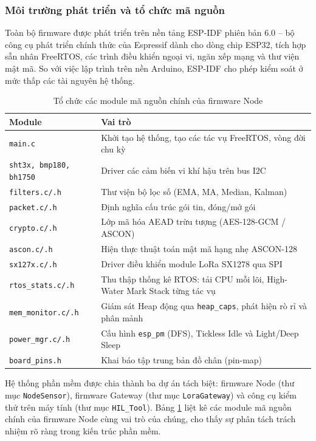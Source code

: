 \subsubsection{Môi trường phát triển và tổ chức mã nguồn}
Toàn bộ firmware được phát triển trên nền tảng ESP-IDF phiên bản 6.0 -- bộ công cụ phát triển chính thức của Espressif dành cho dòng chip ESP32, tích hợp sẵn nhân FreeRTOS, các trình điều khiển ngoại vi, ngăn xếp mạng và thư viện mật mã. So với việc lập trình trên nền Arduino, ESP-IDF cho phép kiểm soát ở mức thấp các tài nguyên hệ thống.
\begin{table}[H]
\centering
\caption{Tổ chức các module mã nguồn chính của firmware Node}
\label{Bảng 4.2}
\renewcommand{\arraystretch}{1.4}
\begin{tabular}{p{4.0cm} p{11.0cm}}
\hline
\textbf{Module} & \textbf{Vai trò} \\ \hline
\texttt{main.c} & Khởi tạo hệ thống, tạo các tác vụ FreeRTOS, vòng đời chu kỳ \\ 
\texttt{sht3x, bmp180, bh1750} & Driver các cảm biến vi khí hậu trên bus I2C \\ 
\texttt{filters.c/.h} & Thư viện bộ lọc số (EMA, MA, Median, Kalman) \\ 
\texttt{packet.c/.h} & Định nghĩa cấu trúc gói tin, đóng/mở gói \\
\texttt{crypto.c/.h} & Lớp mã hóa AEAD trừu tượng (AES-128-GCM / ASCON) \\ 
\texttt{ascon.c/.h} & Hiện thực thuật toán mật mã hạng nhẹ ASCON-128 \\
\texttt{sx127x.c/.h} & Driver điều khiển module LoRa SX1278 qua SPI \\ 
\texttt{rtos\_stats.c/.h} & Thu thập thống kê RTOS: tải CPU mỗi lõi, High-Water Mark Stack từng tác vụ \\ 
\texttt{mem\_monitor.c/.h} & Giám sát Heap động qua \texttt{heap\_caps}, phát hiện rò rỉ và phân mảnh \\ 
\texttt{power\_mgr.c/.h} & Cấu hình \texttt{esp\_pm} (DFS), Tickless Idle và Light/Deep Sleep \\ 
\texttt{board\_pins.h} & Khai báo tập trung bản đồ chân (pin-map) \\ \hline
\end{tabular}
\end{table}
Hệ thống phần mềm được chia thành ba dự án tách biệt: firmware Node (thư mục \texttt{NodeSensor}), firmware Gateway (thư mục \texttt{LoraGateway}) và công cụ kiểm thử trên máy tính (thư mục \texttt{HIL\_Tool}). Bảng \ref{Bảng 4.2} liệt kê các module mã nguồn chính của firmware Node cùng vai trò của chúng, cho thấy sự phân tách trách nhiệm rõ ràng trong kiến trúc phần mềm.




